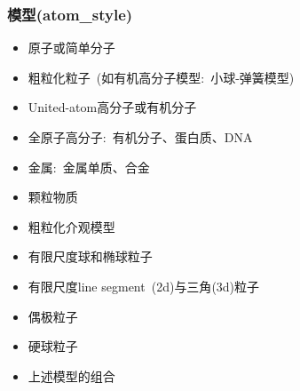 \frame
{
	\frametitle{模型\textrm{(atom\_style)}}
	\begin{itemize}
		\item 原子或简单分子
		\item 粗粒化粒子~(如有机高分子模型:~小球-弹簧模型)
		\item \textrm{United-atom}高分子或有机分子
		\item 全原子高分子:~有机分子、蛋白质、\textrm{DNA}
		\item 金属:~金属单质、合金
		\item 颗粒物质
		\item 粗粒化介观模型
		\item 有限尺度球和椭球粒子
		\item 有限尺度\textrm{line segment~(2d)}与三角\textrm{(3d)}粒子
		\item 偶极粒子
		\item 硬球粒子
		\item 上述模型的组合
	\end{itemize}
}

